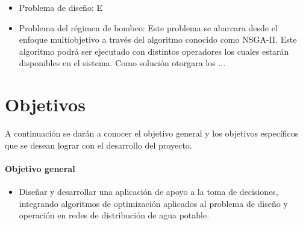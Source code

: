 \documentclass[11pt,letterpaper]{article}
\begin{document}
\begin{itemize}
	\item Problema de diseño: E
	\item Problema del régimen de bombeo: Este problema se abarcara desde el enfoque multiobjetivo a través del algoritmo conocido como NSGA-II. Este algoritmo podrá ser ejecutado con distintos operadores los cuales estarán disponibles en el sistema. Como solución otorgara los ...
\end{itemize}

\section{Objetivos}

A continuación se darán a conocer el objetivo general y los objetivos específicos que se desean lograr con el desarrollo del proyecto.

\paragraph{Objetivo general}

\begin{itemize}
\item Diseñar y desarrollar una aplicación de apoyo a la toma de decisiones, integrando algoritmos de optimización aplicados al problema de diseño y operación en redes de distribución de agua potable.
\end{itemize}
\end{document}

